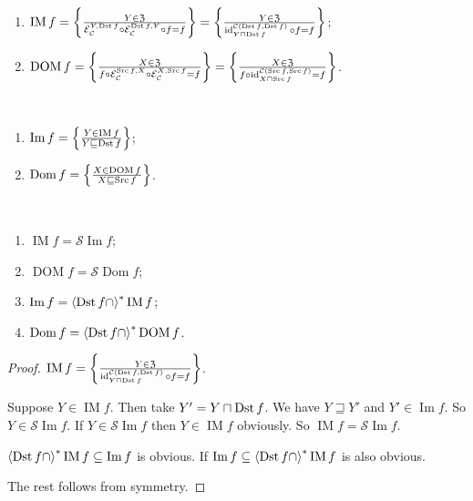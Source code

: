 \begin{defn}
~
\begin{enumerate}
\item $\operatorname{IM} f = \left\{ \frac{Y \in \mathfrak{Z}}{\mathcal{E}_{\mathcal{C}}^{Y, \operatorname{Dst} f} \circ \mathcal{E}_{\mathcal{C}}^{\operatorname{Dst} f,
Y} \circ f = f}\right\} = \left\{ \frac{Y \in \mathfrak{Z}}{\operatorname{id}^{\mathcal{C}(\operatorname{Dst} f,\operatorname{Dst} f)}_{Y\sqcap\operatorname{Dst} f} \circ f = f}\right\}$;
\item $\operatorname{DOM} f = \left\{ \frac{X \in \mathfrak{Z}}{f\circ\mathcal{E}_{\mathcal{C}}^{\operatorname{Src} f, X} \circ \mathcal{E}_{\mathcal{C}}^{X, \operatorname{Src} f} = f}\right\} = \left\{ \frac{X \in \mathfrak{Z}}{f \circ \operatorname{id}^{\mathcal{C}(\operatorname{Src} f,\operatorname{Src} f)}_{X\sqcap\operatorname{Src} f} = f}\right\}$.
\end{enumerate}
\end{defn}

\begin{defn}
~
\begin{enumerate}
\item $\operatorname{Im} f = \left\{ \frac{Y\in\operatorname{IM} f}{Y\sqsubseteq\operatorname{Dst} f}\right\}$;
\item $\operatorname{Dom} f = \left\{ \frac{X\in\operatorname{DOM} f}{X\sqsubseteq\operatorname{Src} f}\right\}$.
\end{enumerate}
\end{defn}

\begin{prop}
~
\begin{enumerate}
\item $\operatorname{IM} f = \mathscr{S}\operatorname{Im} f$;
\item $\operatorname{DOM} f = \mathscr{S}\operatorname{Dom} f$;
\item $\operatorname{Im} f = \left\langle \operatorname{Dst} f\cap\right\rangle ^{\ast}\operatorname{IM} f$;
\item $\operatorname{Dom} f = \left\langle \operatorname{Dst} f\cap\right\rangle ^{\ast}\operatorname{DOM} f$.
\end{enumerate}
\end{prop}

\begin{proof}
$\operatorname{IM} f =
\left\{ \frac{Y \in \mathfrak{Z}}{\operatorname{id}^{\mathcal{C}(\operatorname{Dst} f,\operatorname{Dst} f)}_{Y\sqcap\operatorname{Dst} f} \circ f = f}\right\}$.

Suppose $Y\in\operatorname{IM}f$. Then take $Y'=Y\sqcap\operatorname{Dst} f$. We have $Y\sqsupseteq Y'$ and $Y'\in\operatorname{Im}f$. So $Y\in\mathscr{S}\operatorname{Im}f$. If $Y\in\mathscr{S}\operatorname{Im}f$ then $Y\in\operatorname{IM}f$ obviously.
So $\operatorname{IM} f = \mathscr{S}\operatorname{Im} f$.

$\left\langle \operatorname{Dst} f\cap\right\rangle ^{\ast}\operatorname{IM}f\subseteq
\operatorname{Im}f$ is obvious. If
$\operatorname{Im}f\subseteq\left\langle \operatorname{Dst} f\cap\right\rangle ^{\ast}\operatorname{IM}f$ is also obvious.

The rest follows from symmetry.
\end{proof}

